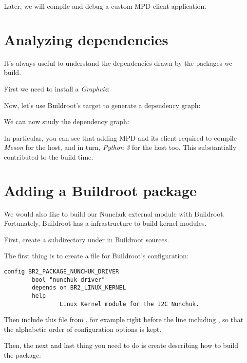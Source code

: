 Later, we will compile and debug a custom MPD client application.

\section{Analyzing dependencies}

It's always useful to understand the dependencies drawn by the
packages we build.

First we need to install a {\em Graphviz}:


Now, let's use Buildroot's target to generate a
dependency graph:


We can now study the dependency graph:


In particular, you can see that adding MPD and its client
required to compile {\em Meson} for the host, and in turn,
{\em Python 3} for the host too. This substantially contributed to the
build time.

\section{Adding a Buildroot package}

We would also like to build our Nunchuk external module with Buildroot.
Fortunately, Buildroot has a  infrastructure
to build kernel modules.

First, create a  subdirectory under 
in Buildroot sources.

The first thing is to create a  file
for Buildroot's configuration:

\begin{verbatim}
config BR2_PACKAGE_NUNCHUK_DRIVER
        bool "nunchuk-driver"
        depends on BR2_LINUX_KERNEL
        help
                Linux Kernel module for the I2C Nunchuk.
\end{verbatim}

Then include this file from , for example right
before the line including ,
so that the alphabetic order of configuration options is kept.

Then, the next and last thing you need to do is create
 describing how to build
the package:

